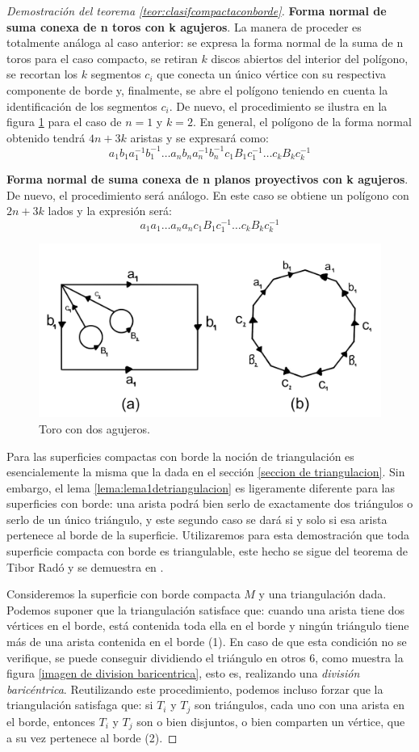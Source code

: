 \documentclass[a4paper,11pt,spanish, twoside, leqno]{tfg-uam}
\theoremstyle{definition}
\begin{document}
\begin{proof}[Demostración del teorema \ref{teor:clasifcompactaconborde}]
\noindent \textbf{Forma normal de suma conexa de n toros con k agujeros}. La manera de proceder es totalmente análoga al caso anterior: se expresa la forma normal de la suma de n toros para el caso compacto, se retiran $k$ discos abiertos del interior del polígono, se recortan los $k$ segmentos $c_i$ que conecta un único vértice con su respectiva componente de borde y, finalmente, se abre el polígono teniendo en cuenta la identificación de los segmentos $c_i$. De nuevo, el procedimiento se ilustra en la figura \ref{imagen de toro con dos agujeros} para el caso de $n=1$ y $k=2$. En general, el polígono de la forma normal obtenido tendrá $4n+3k$ aristas y se expresará como:
\[ a_1b_1a_1^{-1}b_1^{-1}\ldots a_nb_na_n^{-1}b_n^{-1}c_1B_1c_1^{-1}\ldots c_kB_kc_k^{-1}  \] 

\noindent \textbf{Forma normal de suma conexa de n planos proyectivos con k agujeros}. De nuevo, el procedimiento será análogo. En este caso se obtiene un polígono con $2n+3k$ lados y la expresión será:
\[ a_1a_1\ldots a_na_nc_1B_1c_1^{-1}\ldots c_kB_kc_k^{-1}  \] 

\begin{figure}[h!]
	\centering
	\includegraphics[width=0.5\linewidth]{imagenes/toro2agujeros.png}
	\caption{Toro con dos agujeros.}
    \label{imagen de toro con dos agujeros}
\end{figure}

Para las superficies compactas con borde la noción de triangulación es esencialemente la misma que la dada en el sección \ref{seccion de triangulacion}. Sin embargo, el lema \ref{lema:lema1detriangulacion} es ligeramente diferente para las superficies con borde: una arista podrá bien serlo de exactamente dos triángulos o serlo de un único triángulo, y este segundo caso se dará si y solo si esa arista pertenece al borde de la superficie. Utilizaremos para esta demostración que toda superficie compacta con borde es triangulable, este hecho se sigue del teorema de Tibor Radó y se demuestra en \cite{Ahlfors}.

Consideremos la superficie con borde compacta $M$ y una triangulación dada. Podemos suponer que la triangulación satisface que: cuando una arista tiene dos vértices en el borde, está contenida toda ella en el borde y ningún triángulo tiene más de una arista contenida en el borde (1). En caso de que esta condición no se verifique, se puede conseguir dividiendo el triángulo en otros 6, como muestra la figura \ref{imagen de division baricentrica}, esto es, realizando una \textit{división baricéntrica}. Reutilizando este procedimiento, podemos incluso forzar que la triangulación satisfaga que: si $T_i$ y $T_j$ son triángulos, cada uno con una arista en el borde, entonces  $T_i$ y $T_j$ son o bien disjuntos, o bien comparten un vértice, que a su vez pertenece al borde (2). 


\end{proof}
\end{document}
